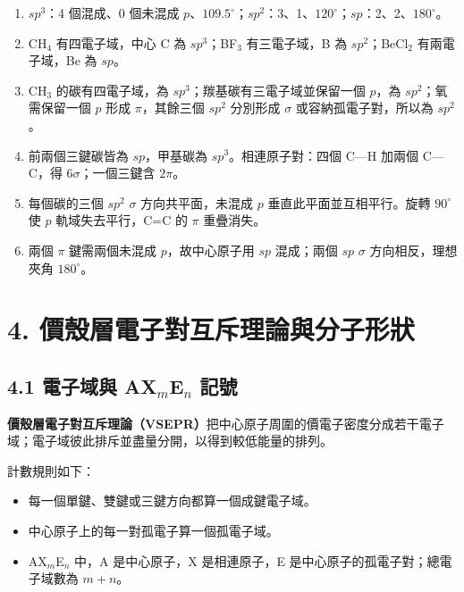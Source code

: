 \documentclass[11pt,a4paper]{article}
\providecommand{\tightlist}{%
  \setlength{\itemsep}{0pt}\setlength{\parskip}{0pt}}
\begin{document}
\begin{enumerate}
\def\labelenumi{\arabic{enumi}.}
\tightlist
\item
  \(sp^3\)：4 個混成、0 個未混成 \(p\)、\(109.5^\circ\)；\(sp^2\)：3、1、\(120^\circ\)；\(sp\)：2、2、\(180^\circ\)。
\item
  CH\(_4\) 有四電子域，中心 C 為 \(sp^3\)；BF\(_3\) 有三電子域，B 為 \(sp^2\)；BeCl\(_2\) 有兩電子域，Be 為 \(sp\)。
\item
  CH\(_3\) 的碳有四電子域，為 \(sp^3\)；羰基碳有三電子域並保留一個 \(p\)，為 \(sp^2\)；氧需保留一個 \(p\) 形成 \(\pi\)，其餘三個 \(sp^2\) 分別形成 \(\sigma\) 或容納孤電子對，所以為 \(sp^2\)。
\item
  前兩個三鍵碳皆為 \(sp\)，甲基碳為 \(sp^3\)。相連原子對：四個 C---H 加兩個 C---C，得 \(6\sigma\)；一個三鍵含 \(2\pi\)。
\item
  每個碳的三個 \(sp^2\) \(\sigma\) 方向共平面，未混成 \(p\) 垂直此平面並互相平行。旋轉 \(90^\circ\) 使 \(p\) 軌域失去平行，C=C 的 \(\pi\) 重疊消失。
\item
  兩個 \(\pi\) 鍵需兩個未混成 \(p\)，故中心原子用 \(sp\) 混成；兩個 \(sp\) \(\sigma\) 方向相反，理想夾角 \(180^\circ\)。
\end{enumerate}

\section{4. 價殼層電子對互斥理論與分子形狀}\label{ux50f9ux6bbcux5c64ux96fbux5b50ux5c0dux4e92ux65a5ux7406ux8ad6ux8207ux5206ux5b50ux5f62ux72c0}

\subsection{\texorpdfstring{4.1 電子域與 AX\(_m\)E\(_n\) 記號}{4.1 電子域與 AX\_mE\_n 記號}}\label{ux96fbux5b50ux57dfux8207-ax_me_n-ux8a18ux865f}

\textbf{價殼層電子對互斥理論（VSEPR）}把中心原子周圍的價電子密度分成若干電子域；電子域彼此排斥並盡量分開，以得到較低能量的排列。

計數規則如下：

\begin{itemize}
\tightlist
\item
  每一個單鍵、雙鍵或三鍵方向都算一個成鍵電子域。
\item
  中心原子上的每一對孤電子算一個孤電子域。
\item
  AX\(_m\)E\(_n\) 中，A 是中心原子，X 是相連原子，E 是中心原子的孤電子對；總電子域數為 \(m+n\)。
\end{itemize}
\end{document}
